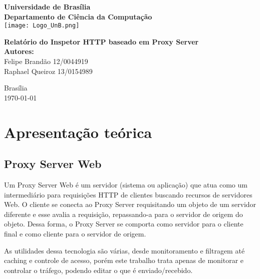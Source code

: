 \documentclass[a4paper, 12pt]{article}
\begin{document}
\begin{titlepage}

\begin{center}
\textbf{\LARGE Universidade de Brasília}\\[0.5cm] 
\textbf{\large Departamento de Ciência da Computação}\\[0.2cm]
\vspace{20pt}
\texttt{[image: Logo\_UnB.png]}\\[1cm]
\par
\vspace{32pt}
\textbf{\LARGE Relatório do Inspetor HTTP baseado em Proxy Server}\\
\vspace{30pt}
\textbf {\Large Autores:}\\[0.2cm]
\Large {Felipe Brandão 12/0044919}\\[0.1cm]
\Large {Raphael Queiroz	13/0154989}\\[0.1cm]
\end{center}

\par
\vfill

\begin{center}
{{\normalsize Brasília}\\
{\normalsize \today}}
\end{center}

\end{titlepage}

\newpage
\tableofcontents
\thispagestyle{empty}

\newpage
\section{Apresentação teórica}
\subsection{Proxy Server Web}
Um Proxy Server Web é um servidor (sistema ou aplicação) que atua como um intermediário para requisições HTTP de clientes buscando recursos de servidores Web. O cliente se conecta ao Proxy Server requisitando um objeto de um servidor diferente e esse avalia a requisição, repassando-a para o servidor de origem do objeto. Dessa forma, o Proxy Server se comporta como servidor para o cliente final e como cliente para o servidor de origem.

As utilidades dessa tecnologia são várias, desde monitoramento e filtragem até caching e controle de acesso, porém este trabalho trata apenas de monitorar e controlar o tráfego, podendo editar o que é enviado/recebido.
\end{document}
